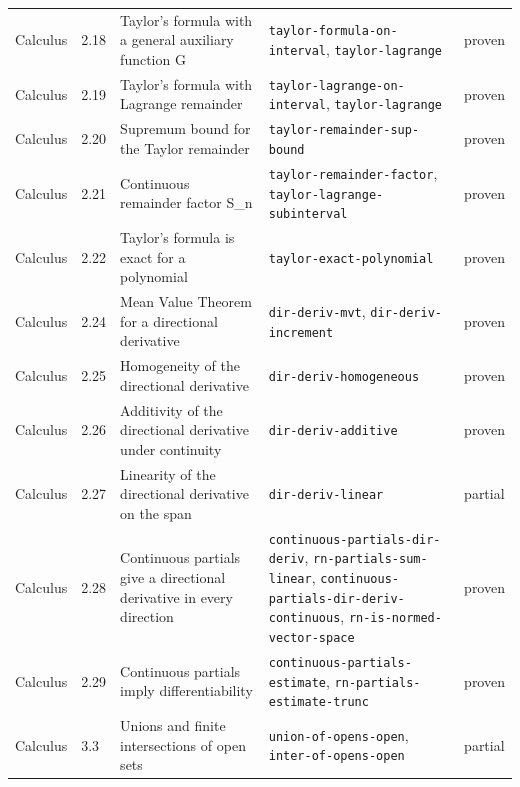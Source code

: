 \begin{longtable}{@{}ll>{\raggedright\arraybackslash}p{4.2cm}>{\raggedright\arraybackslash}p{4.2cm}l@{}}
Calculus & 2.18 & Taylor's formula with a general auxiliary function G & \texttt{taylor-\allowbreak{}formula-\allowbreak{}on-\allowbreak{}interval}, \texttt{taylor-\allowbreak{}lagrange} & proven \\
Calculus & 2.19 & Taylor's formula with Lagrange remainder & \texttt{taylor-\allowbreak{}lagrange-\allowbreak{}on-\allowbreak{}interval}, \texttt{taylor-\allowbreak{}lagrange} & proven \\
Calculus & 2.20 & Supremum bound for the Taylor remainder & \texttt{taylor-\allowbreak{}remainder-\allowbreak{}sup-\allowbreak{}bound} & proven \\
Calculus & 2.21 & Continuous remainder factor S\_n & \texttt{taylor-\allowbreak{}remainder-\allowbreak{}factor}, \texttt{taylor-\allowbreak{}lagrange-\allowbreak{}subinterval} & proven \\
Calculus & 2.22 & Taylor's formula is exact for a polynomial & \texttt{taylor-\allowbreak{}exact-\allowbreak{}polynomial} & proven \\
Calculus & 2.24 & Mean Value Theorem for a directional derivative & \texttt{dir-\allowbreak{}deriv-\allowbreak{}mvt}, \texttt{dir-\allowbreak{}deriv-\allowbreak{}increment} & proven \\
Calculus & 2.25 & Homogeneity of the directional derivative & \texttt{dir-\allowbreak{}deriv-\allowbreak{}homogeneous} & proven \\
Calculus & 2.26 & Additivity of the directional derivative under continuity & \texttt{dir-\allowbreak{}deriv-\allowbreak{}additive} & proven \\
Calculus & 2.27 & Linearity of the directional derivative on the span & \texttt{dir-\allowbreak{}deriv-\allowbreak{}linear} & partial \\
Calculus & 2.28 & Continuous partials give a directional derivative in every direction & \texttt{continuous-\allowbreak{}partials-\allowbreak{}dir-\allowbreak{}deriv}, \texttt{rn-\allowbreak{}partials-\allowbreak{}sum-\allowbreak{}linear}, \texttt{continuous-\allowbreak{}partials-\allowbreak{}dir-\allowbreak{}deriv-\allowbreak{}continuous}, \texttt{rn-\allowbreak{}is-\allowbreak{}normed-\allowbreak{}vector-\allowbreak{}space} & proven \\
Calculus & 2.29 & Continuous partials imply differentiability & \texttt{continuous-\allowbreak{}partials-\allowbreak{}estimate}, \texttt{rn-\allowbreak{}partials-\allowbreak{}estimate-\allowbreak{}trunc} & proven \\
Calculus & 3.3 & Unions and finite intersections of open sets & \texttt{union-\allowbreak{}of-\allowbreak{}opens-\allowbreak{}open}, \texttt{inter-\allowbreak{}of-\allowbreak{}opens-\allowbreak{}open} & partial \\

\end{longtable}
